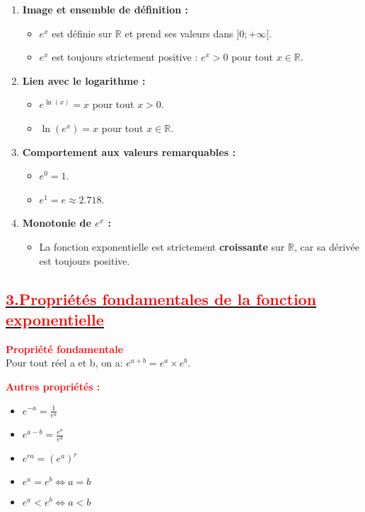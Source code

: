 \documentclass[12pt,a4paper]{article}
\begin{document}
\begin{enumerate}[label=(\alph*)]
    \item \textbf{Image et ensemble de définition :}
    \begin{itemize}
        \item \( e^x \) est définie sur \( \mathbb{R} \) et prend ses valeurs dans \( ]0; +\infty[ \).
        \item \( e^x \) est toujours strictement positive : \( e^x > 0 \) pour tout \( x \in \mathbb{R} \).
    \end{itemize}

    \item \textbf{Lien avec le logarithme :}
    \begin{itemize}
        \item \( e^{\ln(x)} = x \) pour tout \( x > 0 \).
        \item \( \ln(e^x) = x \) pour tout \( x \in \mathbb{R} \).
    \end{itemize}

    \item \textbf{Comportement aux valeurs remarquables :}
    \begin{itemize}
        \item \( e^0 = 1 \).
        \item \( e^1 = e \approx 2.718 \).
    \end{itemize}

    \item \textbf{Monotonie de \( e^x \) :}
    \begin{itemize}
        \item La fonction exponentielle est strictement \textbf{croissante} sur \( \mathbb{R} \), car sa dérivée est toujours positive.
    \end{itemize}
\end{enumerate}

\subsection*{\underline{\textbf{\textcolor{red}{3.Propriétés fondamentales de la fonction exponentielle}}}}
\textbf{\textcolor{red}{Propriété fondamentale}}\\

Pour tout réel a et b, on a: $e^{a+b}=e^{a} \times e^{b}$.

\textbf{\textcolor{red}{ Autres propriétés :}}\\
\begin{itemize}
    \item \textbf{} \(e^{-a}=\frac{1}{e^{a}}\)
    \item \textbf{} \(e^{a-b}=\frac{e^{a}}{e^{b}}\)
    \item \textbf{} \(e^{ra}=(e^{a})^{r}\)
    \item \textbf{} \(e^{a}=e^{b} \Leftrightarrow a=b\)
    \item \textbf{} \(e^{a}<e^{b} \Leftrightarrow a<b\)
\end{itemize}
\end{document}
